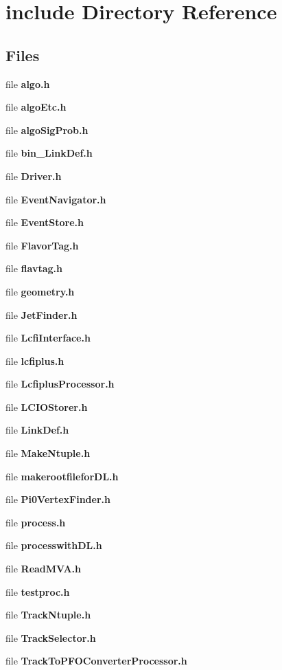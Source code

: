 \section{include Directory Reference}
\label{dir_d44c64559bbebec7f509842c48db8b23}
\subsection*{Files}
\begin{DoxyCompactItemize}
\item 
file \textbf{ algo.\+h}
\item 
file \textbf{ algo\+Etc.\+h}
\item 
file \textbf{ algo\+Sig\+Prob.\+h}
\item 
file \textbf{ bin\+\_\+\+Link\+Def.\+h}
\item 
file \textbf{ Driver.\+h}
\item 
file \textbf{ Event\+Navigator.\+h}
\item 
file \textbf{ Event\+Store.\+h}
\item 
file \textbf{ Flavor\+Tag.\+h}
\item 
file \textbf{ flavtag.\+h}
\item 
file \textbf{ geometry.\+h}
\item 
file \textbf{ Jet\+Finder.\+h}
\item 
file \textbf{ Lcfi\+Interface.\+h}
\item 
file \textbf{ lcfiplus.\+h}
\item 
file \textbf{ Lcfiplus\+Processor.\+h}
\item 
file \textbf{ L\+C\+I\+O\+Storer.\+h}
\item 
file \textbf{ Link\+Def.\+h}
\item 
file \textbf{ Make\+Ntuple.\+h}
\item 
file \textbf{ makerootfilefor\+D\+L.\+h}
\item 
file \textbf{ Pi0\+Vertex\+Finder.\+h}
\item 
file \textbf{ process.\+h}
\item 
file \textbf{ processwith\+D\+L.\+h}
\item 
file \textbf{ Read\+M\+V\+A.\+h}
\item 
file \textbf{ testproc.\+h}
\item 
file \textbf{ Track\+Ntuple.\+h}
\item 
file \textbf{ Track\+Selector.\+h}
\item 
file \textbf{ Track\+To\+P\+F\+O\+Converter\+Processor.\+h}

\end{DoxyCompactItemize}
